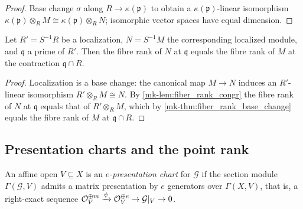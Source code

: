 \begin{proof}
  \leanok
  Base change \(\sigma\) along \(R \to \kappa(\mathfrak p)\) to obtain a
  \(\kappa(\mathfrak p)\)-linear isomorphism
  \(\kappa(\mathfrak p) \otimes_R M \cong \kappa(\mathfrak p) \otimes_R N\);
  isomorphic vector spaces have equal dimension.
\end{proof}

\begin{corollary}
  \label{mk-cor:fiber_rank_localized}
  \leanok

  Let \(R' = S^{-1}R\) be a localization, \(N = S^{-1}M\) the corresponding
  localized module, and \(\mathfrak q\) a prime of \(R'\).  Then the fibre
  rank of \(N\) at \(\mathfrak q\) equals the fibre rank of \(M\) at the
  contraction \(\mathfrak q \cap R\).
\end{corollary}

\begin{proof}
  \leanok
  Localization is a base change: the canonical map \(M \to N\) induces an
  \(R'\)-linear isomorphism \(R' \otimes_R M \cong N\).  By
  \ref{mk-lem:fiber_rank_congr} the fibre rank of \(N\) at \(\mathfrak q\)
  equals that of \(R' \otimes_R M\), which by \ref{mk-thm:fiber_rank_base_change}
  equals the fibre rank of \(M\) at \(\mathfrak q \cap R\).
\end{proof}

\subsection{Presentation charts and the point rank}

\begin{definition}
  \label{mk-def:presentation_chart}
  \leanok

  An affine open \(V \subseteq X\) is an \emph{\(e\)-presentation chart} for
  \(\mathcal G\) if the section module \(\Gamma(\mathcal G, V)\) admits a
  matrix presentation by \(e\) generators over \(\Gamma(X, V)\), that is, a
  right-exact sequence
  \(\mathcal{O}_V^{\oplus m} \xrightarrow{\psi} \mathcal{O}_V^{\oplus e}
    \to \mathcal G|_V \to 0\).
\end{definition}

